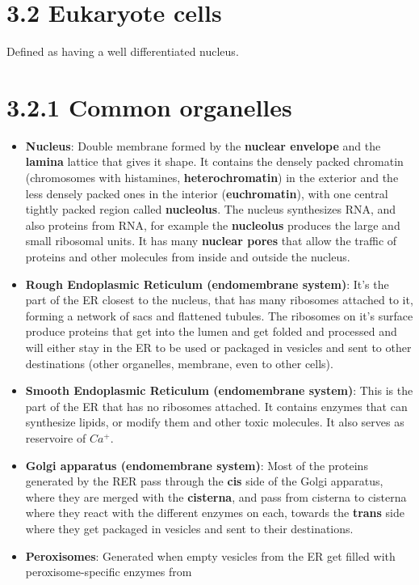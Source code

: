 \documentclass[a4paper,landscape,10pt]{cheatsheet}
\begin{document}
\section*{3.2 Eukaryote cells}
Defined as having a well differentiated nucleus.
\section*{3.2.1 Common organelles}
\begin{itemize}
      \item \textbf{Nucleus}: Double membrane formed by the \textbf{nuclear envelope} and the \textbf{lamina} lattice that
            gives it shape. It contains the densely packed chromatin (chromosomes with histamines, \textbf{heterochromatin})
            in the exterior and the less densely packed ones in the interior (\textbf{euchromatin}), with one central
            tightly packed region called \textbf{nucleolus}. The nucleus synthesizes RNA, and also proteins from RNA, for
            example the \textbf{nucleolus} produces the large and small ribosomal units. It has many \textbf{nuclear pores}
            that allow the traffic of proteins and other molecules from inside and outside the nucleus.
      \item \textbf{Rough Endoplasmic Reticulum (endomembrane system)}: It's the part of the ER closest to the nucleus, that
            has many ribosomes attached to it, forming a network of sacs and flattened tubules. The ribosomes on it's
            surface produce proteins that get into the lumen and get folded and processed and will either stay in the ER to
            be used or packaged in vesicles and sent to other destinations (other organelles, membrane, even to other
            cells).
      \item \textbf{Smooth Endoplasmic Reticulum (endomembrane system)}: This is the part of the ER that has no ribosomes
            attached. It contains enzymes that can synthesize lipids, or modify them and other toxic molecules. It also
            serves as reservoire of $Ca^+$.
      \item \textbf{Golgi apparatus (endomembrane system)}: Most of the proteins generated by the RER pass through the
            \textbf{cis} side of the Golgi apparatus, where they are merged with the \textbf{cisterna}, and pass from
            cisterna to cisterna where they react with the different enzymes on each, towards the \textbf{trans} side where
            they get packaged in vesicles and sent to their destinations.
      \item \textbf{Peroxisomes}: Generated when empty vesicles from the ER get filled with peroxisome-specific enzymes from

\end{itemize}
\end{document}
